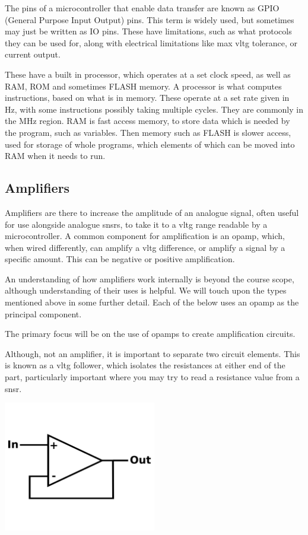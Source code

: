 \documentclass[a4paper,11pt]{report}
\begin{document}
The pins of a microcontroller that enable data transfer are known as GPIO (General Purpose Input Output) pins. This term is widely used, but sometimes may just be written as IO pins. These have limitations, such as what protocols they can be used for, along with electrical limitations like max \gls{vltg} tolerance, or current output.

These have a built in processor, which operates at a set clock speed, as well as RAM, ROM and sometimes FLASH memory. A processor is what computes instructions, based on what is in memory. These operate at a set rate given in Hz, with some instructions possibly taking multiple cycles. They are commonly in the MHz region. RAM is fast access memory, to store data which is needed by the program, such as variables. Then memory such as FLASH is slower access, used for storage of whole programs, which elements of which can be moved into RAM when it needs to run.

\subsection{Amplifiers}

Amplifiers are there to increase the amplitude of an analogue signal, often useful for use alongside analogue \gls{snsr}s, to take it to a \gls{vltg} range readable by a microcontroller. A common component for amplification is an opamp, which, when wired differently, can amplify a \gls{vltg} difference, or amplify a signal by a specific amount. This can be negative or positive amplification.

An understanding of how amplifiers work internally is beyond the course scope, although understanding of their uses is helpful. We will touch upon the types mentioned above in some further detail. Each of the below uses an opamp as the principal component.

The primary focus will be on the use of opamps to create amplification circuits.

Although, not an amplifier, it is important to separate two circuit elements. This is known as a \gls{vltg} follower, which isolates the resistances at either end of the part, particularly important where you may try to read a resistance value from a \gls{snsr}.

\includegraphics[width=0.5\textwidth]{voltagefollower}
\end{document}
